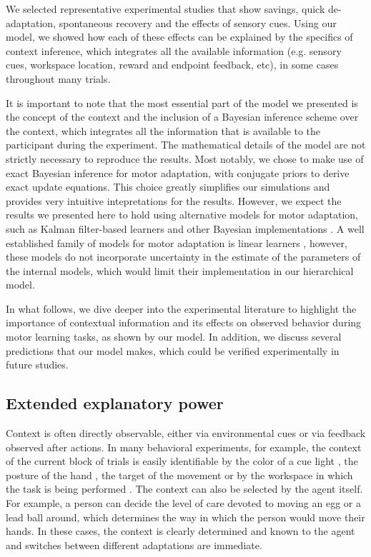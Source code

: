 \documentclass[a4paper,doc,floatsintext,natbib]{apa6}
\begin{document}
We selected representative experimental studies that show savings, quick de-adaptation, spontaneous recovery and the effects of sensory cues. Using our model, we showed how each of these effects can be explained by the specifics of context inference, which integrates all the available information (e.g. sensory cues, workspace location, reward and endpoint feedback, etc), in some cases throughout many trials.

It is important to note that the most essential part of the model we presented is the concept of the context and the inclusion of a Bayesian inference scheme over the context, which integrates all the information that is available to the participant during the experiment. The mathematical details of the model are not strictly necessary to reproduce the results. Most notably, we chose to make use of exact Bayesian inference for motor adaptation, with conjugate priors to derive exact update equations. This choice greatly simplifies our simulations and provides very intuitive intepretations for the results. However, we expect the results we presented here to hold using alternative models for motor adaptation, such as Kalman filter-based learners \cite[e.g.][]{Oh_Minimizing_2019} and other Bayesian implementations \cite[e.g.][]{Wolpert_Multiple_1998a,Kording_Bayesian_2004}. A well established family of models for motor adaptation is linear learners \cite[e.g.][]{Smith_Interacting_2006,Forano_Timescales_2020,Lee_Dual_2009}, however, these models do not incorporate uncertainty in the estimate of the parameters of the internal models, which would limit their implementation in our hierarchical model.

In what follows, we dive deeper into the experimental literature to highlight the importance of contextual information and its effects on observed behavior during motor learning tasks, as shown by our model. In addition, we discuss several predictions that our model makes, which could be verified experimentally in future studies.

\subsection{Extended explanatory power}
Context is often directly observable, either via environmental cues or via feedback observed after actions. In many behavioral experiments, for example, the context of the current block of trials is easily identifiable by the color of a cue light \citep[e.g.][]{Ethier_Spontaneous_2008}, the posture of the hand \citep[e.g.][]{Gandolfo_Motor_1996}, the target of the movement \citep[e.g.][]{Lee_Dual_2009} or by the workspace in which the task is being performed \citep[e.g.][]{Shadmehr_Adaptive_1994}. The context can also be selected by the agent itself. For example, a person can decide the level of care devoted to moving an egg or a lead ball around, which determines the way in which the person would move their hands. In these cases, the context is clearly determined and known to the agent and switches between different adaptations are immediate.
\end{document}
